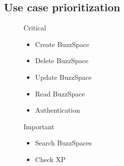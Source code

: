 \documentclass{article}
\begin{document}
	\subsection{Use case prioritization}
	\begin{description}
		\item[] Critical
		\begin{itemize}
			\item Create BuzzSpace
			\item Delete BuzzSpace
			\item Update BuzzSpace
			\item Read BuzzSpace
			\item Authentication
		\end{itemize}
		
		\item[] Important
		\begin{itemize}
			\item Search BuzzSpaces
			\item Check XP
		\end{itemize}
	\end{description}
	
\end{document}
